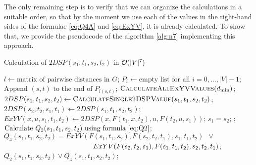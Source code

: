 The only remaining step is to verify that we can organize the calculations in a suitable order, so that by the moment we use each of the values in the right-hand sides of the formulae \eqref{eq:Q4A} and \eqref{eq:ExYV}, it is already calculated. To show that, we provide the pseudocode of the algorithm \ref{alg:n7} implementing this approach.

\begin{algorithm}
\caption{Calculation of $2DSP(s_1, t_1, s_2, t_2)$ in $\mathcal{O}(|V|^7)$} \label{alg:n7}
\begin{algorithmic}[1]
\State $l \gets \text{matrix of pairwise distances in }G$;
\State $P_i \gets \text{empty list for all }i = 0, \ldots, |V|-1$;
    \State $\text{Append }(s, t)\text{ to the end of }P_{l(s, t)}$;
\EndFor
{}
    \State $\textsc{CalculateAllExYVValues}(d_{\min})$; \label{line:calcExYV}
                \State $2DSP(s_1, t_1, s_2, t_2) \gets \textsc{CalculateSingle2DSPValue}(s_1, t_1, s_2, t_2)$;
                \State $2DSP(s_2, t_2, s_1, t_1) \gets 2DSP(s_1, t_1, s_2, t_2)$; 
            \EndFor
        \EndFor
    \EndFor
\EndFor
\EndProcedure
\Statex
{}
                \State $ExYV(x,u,s_1,t_1,t_2) \gets 2DSP(x, F(t_1,x,t_2), u, F(t_2,u,s_1))$;
            \EndFor
        \EndFor
    \EndFor
\EndProcedure
\Statex
{}
    \State \Return $s_1 = s_2$; 
    \State {};
\Else
    \State $\text{Calculate }Q_2(s_1, t_1, s_2, t_2)\text{ using formula \eqref{eq:Q2}}$; 
    \State $Q_4(s_1, t_1, s_2, t_2) = ExYV(F(s_1, t_1, s_2), F(s_2, t_2, t_1), s_1, t_1, t_2)\enspace\vee\enspace$ 
    \Statex $\hspace{4.5cm}ExYV(F(s_2, t_2, s_1), F(s_1, t_1, t_2), s_2, t_2, t_1)$; \label{line:useExYV}
    \State \Return $Q_2(s_1, t_1, s_2, t_2) \vee Q_4(s_1, t_1, s_2, t_2)$;
\EndIf
\EndProcedure
\end{algorithmic}
\end{algorithm}

